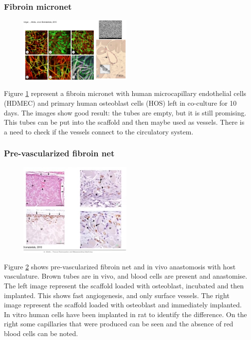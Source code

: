         \subsubsection{Fibroin micronet}

        \begin{figure}[h]
            \centering
            \includegraphics[width=0.5\textwidth]{fibroin}
            \caption{\label{fig:fibroin}}
        \end{figure}

        Figure \ref{fig:fibroin} represent a fibroin micronet with human microcapillary endothelial cells (HDMEC) and primary human osteoblast cells (HOS) left in co-culture for 10 days.
        The images show good result: the tubes are empty, but it is still promising.
        This tubes can be put into the scaffold and then maybe used as vessels.
        There is a need to check if the vessels connect to the circulatory system.

        \subsubsection{Pre-vascularized fibroin net}

        \begin{figure}[h]
            \centering
            \includegraphics[width=0.5\textwidth]{osteoblast}
            \caption{\label{fig:osteoblast}}
        \end{figure}

        Figure \ref{fig:osteoblast} shows pre-vascularized fibroin net and in vivo anastomosis with host vasculature.
        Brown tubes are in vivo, and  blood cells are present and anastomise.
        The left image represent the scaffold loaded with osteoblast, incubated and then implanted.
        This shows fast angiogenesis, and only surface vessels.
        The right image represent the scaffold loaded with osteoblast and immediately implanted.
        In vitro human cells have been implanted in rat to identify the difference.
        On the right some capillaries that were produced can be seen and the absence of red blood cells can be noted.

